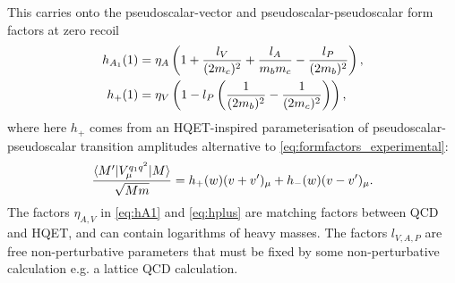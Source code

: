 This carries onto the pseudoscalar-vector and pseudoscalar-pseudoscalar form factors at zero recoil
\begin{align}
  \label{eq:hA1}
  h_{A_1}(1) &= \eta_A \left( 1 + {l_V\over (2m_c)^2} + {l_A\over m_b m_c} - {l_P\over (2m_b)^2} \right), \\
  h_+(1) &= \eta_V \left( 1 - l_P \left( {1\over (2m_b)^2} - {1\over (2m_c)^2} \right) \right),
  \label{eq:hplus}
\end{align}
where here $h_+$ comes from an HQET-inspired parameterisation of pseudoscalar-pseudoscalar transition amplitudes alternative to \eqref{eq:formfactors_experimental}:
\begin{align}
  {\langle M' | V^{q_1q^2}_{\mu} | M \rangle \over \sqrt{Mm}} = h_+(w)(v+v')_{\mu} + h_-(w)(v-v')_{\mu}.
  \label{eq:pseudoscalar_hqet}
\end{align}
The factors $\eta_{A,V}$ in \eqref{eq:hA1} and \eqref{eq:hplus} are matching factors between QCD and HQET, and can contain logarithms of heavy masses. The factors $l_{V,A,P}$ are free non-perturbative parameters that must be fixed by some non-perturbative calculation e.g. a lattice QCD calculation.



